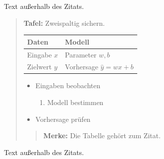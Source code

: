 Text außerhalb des Zitats.

\begin{quote}
\textbf{Tafel:} Zweispaltig sichern.

\par\addvspace{\medskipamount}
\noindent\begin{tabularx}{\linewidth}{@{}>{\raggedright\arraybackslash}p{}>{\raggedright\arraybackslash}X@{}}
\toprule
Daten & Modell \\
\midrule
Eingabe $x$ & Parameter $w,b$ \\
Zielwert $y$ & Vorhersage $\hat y=wx+b$ \\
\bottomrule
\end{tabularx}
\par\addvspace{\medskipamount}

\begin{itemize}
\item Eingaben beobachten
\begin{enumerate}
\item Modell bestimmen
\end{enumerate}
\item Vorhersage prüfen
\end{itemize}

\begin{quote}
\textbf{Merke:} Die Tabelle gehört zum Zitat.
\end{quote}
\end{quote}

Text außerhalb des Zitats.

